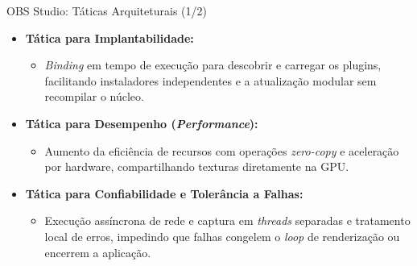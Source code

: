 \documentclass[aspectratio=169]{beamer}
\begin{document}
\begin{frame}{OBS Studio: Táticas Arquiteturais (1/2)}
\begin{itemize}\setlength{\itemsep}{0.8em}
\item \textbf{Tática para Implantabilidade:}
  \begin{itemize}
  \item \textit{Binding} em tempo de execução para descobrir e carregar os plugins, facilitando instaladores independentes e a atualização modular sem recompilar o núcleo.
  \end{itemize}
\item \textbf{Tática para Desempenho (\textit{Performance}):}
  \begin{itemize}
  \item Aumento da eficiência de recursos com operações \textit{zero-copy} e aceleração por hardware, compartilhando texturas diretamente na GPU.
  \end{itemize}
\item \textbf{Tática para Confiabilidade e Tolerância a Falhas:}
  \begin{itemize}
  \item Execução assíncrona de rede e captura em \textit{threads} separadas e tratamento local de erros, impedindo que falhas congelem o \textit{loop} de renderização ou encerrem a aplicação.
  \end{itemize}
\end{itemize}
\end{frame}
\end{document}

